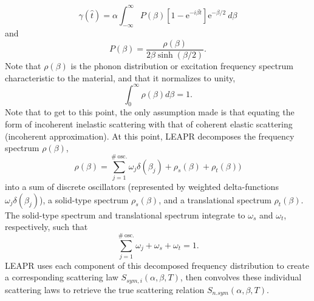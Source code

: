\documentclass[../master.tex]{subfiles}
\begin{document}
			\begin{equation} 
				\gamma(\hat{t})=\alpha\int_{-\infty}^{\infty}P(\beta)\left[1-\mathrm{e}^{-i\beta\hat{t}}\right]\mathrm{e}^{-\beta/2}~d\beta\label{eq:gamma}
			\end{equation}
			and
			\begin{equation}
				P(\beta)=\frac{\rho(\beta)}{2\beta\sinh(\beta/2)}.
			\end{equation}
			Note that $\rho(\beta)$ is the phonon distribution or excitation frequency spectrum characteristic to the material, and that it normalizes to unity,
			\begin{equation}
				\int_{0}^{\infty}\rho(\beta)d\beta=1.
			\end{equation}
			Note that to get to this point, the only assumption made is that equating the form of incoherent inelastic scattering with that of coherent elastic scattering (incoherent approximation). At this point, LEAPR decomposes the frequency spectrum $\rho(\beta)$,
			\begin{equation}
				\rho(\beta)=\sum_{j=1}^{\#~\mbox{osc.}}\omega_j\delta(\beta_j)+\rho_s(\beta)+\rho_t(\beta))
			\end{equation}
			into a sum of discrete oscillators (represented by weighted delta-functions $\omega_j\delta(\beta_j)$), a solid-type spectrum $\rho_s(\beta)$, and a translational spectrum $\rho_t(\beta)$. The solid-type spectrum and translational spectrum integrate to $\omega_s$ and $\omega_t$, respectively, such that 
			\begin{equation}
                          \sum_{j=1}^{\#~\mbox{osc.}}\omega_j + \omega_s + \omega_t = 1.\label{eq:weightsSumTo1}
			\end{equation}
			LEAPR uses each component of this decomposed frequency distribution to create a corresponding scattering law $S_{sym,i}(\alpha,\beta,T)$, then convolves these individual scattering laws to retrieve the true scattering relation $S_{n.sym}(\alpha,\beta,T)$.
\end{document}
